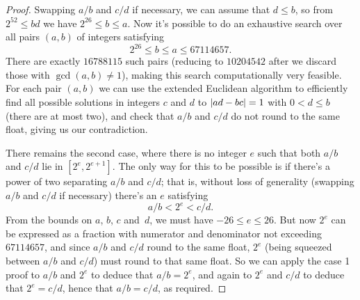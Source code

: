 \documentclass[a4paper]{article}
\DeclarePairedDelimiter\abs{\lvert}{\rvert}
\theoremstyle{plain}
\theoremstyle{definition}
\begin{document}
\begin{proof}
    Swapping $a/b$ and $c/d$ if necessary, we can assume that $d \le b$, so
    from $2^{52} \le bd$ we have $2^{26} \le b \le a$. Now it's possible to do
    an exhaustive search over all pairs $(a, b)$ of integers satisfying
    $$ 2^{26} \le b \le a \le 67114657.$$ There are exactly $16788115$ such
    pairs (reducing to $10204542$ after we discard those with $\gcd(a, b) \ne
    1$), making this search computationally very feasible. For each pair $(a,
    b)$ we can use the extended Euclidean algorithm to efficiently find all
    possible solutions in integers $c$ and $d$ to $\abs{ad - bc} = 1$ with $0 <
    d \le b$ (there are at most two), and check that $a/b$ and $c/d$ do not
    round to the same float, giving us our contradiction.

    There remains the second case, where there is no integer $e$ such that
    both $a/b$ and $c/d$ lie in $[2^e, 2^{e+1}]$. The only way for this to
    be possible is if there's a power of two separating $a/b$ and $c/d$; that
    is, without loss of generality (swapping $a/b$ and $c/d$ if necessary)
    there's an $e$ satisfying
    $$a/b < 2^e < c/d.$$
    From the bounds on $a$, $b$, $c$ and~$d$, we must have
    $-26 \le e \le 26$. But now $2^e$ can be expressed as a fraction with
    numerator and denominator not exceeding $67114657$, and since $a/b$ and
    $c/d$ round to the same float, $2^e$ (being squeezed between $a/b$ and
    $c/d$) must round to that same float. So we can apply the case 1 proof to
    $a/b$ and $2^e$ to deduce that $a/b = 2^e$, and again to $2^e$ and $c/d$ to
    deduce that $2^e = c/d$, hence that $a/b = c/d$, as required.
\end{proof}
\end{document}
